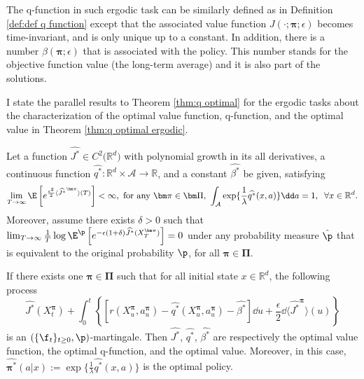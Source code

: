 The q-function in such ergodic task can be similarly defined as in Definition \ref{def:def q function} except that the associated value function $J(\cdot;\bm\pi;\epsilon)$ becomes time-invariant, and is only unique up to a constant. In addition, there is a number $\beta(\bm\pi;\epsilon)$ that is associated with the policy. This number stands for the objective function value (the long-term average) and it is also part of the solutions. 

I state the parallel results to Theorem \ref{thm:q optimal} for the ergodic tasks about the characterization of the optimal value function, q-function, and the optimal value in Theorem \ref{thm:q optimal ergodic}.
\begin{theorem}
	\label{thm:q optimal ergodic}
	Let a function $\widehat{J^*}\in C^{2}\big(\mathbb{R}^d \big)$ with polynomial growth in its all derivatives, a continuous function $\widehat{q^*}: \mathbb{R}^d\times \mathcal{A}\to \mathbb{R}$, and a constant $\widehat{\beta^*}$ be given, satisfying
	\begin{equation}
		\label{eq:q hjb2 optimal ergodic}
		\lim_{T\to \infty}\E\left[ e^{\frac{\epsilon^2}{2} \langle \widehat{J^*}^{\bm \pi}\rangle(T) }  \right] < \infty, \text{ for any } \bm \pi\in \bm\Pi,\  \int_{\mathcal{A}} \exp\{ \frac{1}{\lambda} \widehat{q^*}(x,a) \} \dd a =1,\;\;\forall x\in \mathbb{R}^d.
	\end{equation}
	Moreover, assume there exists $\delta > 0$ such that $\lim_{T\to \infty}\frac{1}{T}\log\E^{\p}\left[ e^{-\epsilon (1+\delta) \widehat{J^*}(X_T^{\bm \pi}) }  \right] = 0$ under any probability measure $\hat\p$ that is equivalent to the original probability $\p$, for all $\bm\pi\in \bm\Pi$.
	
	If there exists one $\bm\pi\in \bm\Pi$ such that for all initial state $x\in \mathbb{R}^d$, the following process
	\begin{equation}
		\label{eq:martingale with q function2 optimal ergodic}
		\widehat{J^*}({X}_t^{\bm\pi}) + \int_0^t \left\{ \left[ r({X}_{u}^{\bm\pi},a^{\bm\pi}_{u}) - \widehat{q^*}({X}_{u}^{\bm\pi},a^{\bm\pi}_{u}) - \widehat{\beta^*}  \right]\dd u + \frac{\epsilon}{2}\dd \langle \widehat{J^*}^{\bm\pi} \rangle(u)\right\}
	\end{equation}
	is an $(\{\f_t\}_{t\geq 0},\p)$-martingale. Then $\widehat{J^*}$, $\widehat{q^*}$, $\widehat{\beta^*}$ are respectively the optimal value function, the optimal q-function, and the optimal value. Moreover, in this case, $\widehat{\bm\pi^*}(a|x):= \exp\{  \frac{1}{\lambda}\widehat{q^*}(x,a) \}$ is the optimal policy.
\end{theorem}

